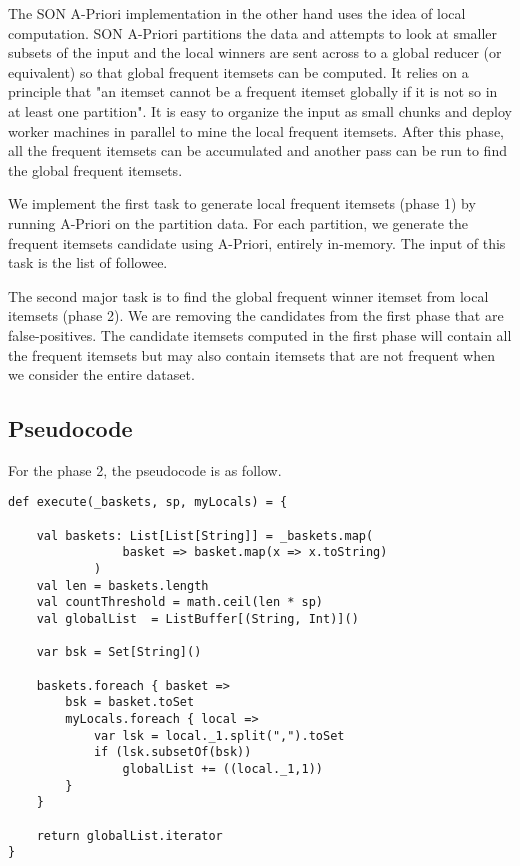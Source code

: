 \documentclass[11pt]{article}
\begin{document}
The SON A-Priori implementation in the other hand uses the idea of local computation.
SON A-Priori partitions the data and attempts to look at smaller subsets of the input and the local winners are sent across to a global reducer (or equivalent) so that global frequent itemsets can be computed.
It relies on a principle that "an itemset cannot be a frequent itemset globally if it is not so in at least one partition".
It is easy to organize the input as small chunks and deploy worker machines in parallel to mine the local frequent itemsets.
After this phase, all the frequent itemsets can be accumulated and another pass can be run to find the global frequent itemsets.

We implement the first task to generate local frequent itemsets (phase 1) by running A-Priori on the partition data.
For each partition, we generate the frequent itemsets candidate using A-Priori, entirely in-memory.
The input of this task is the list of followee.

The second major task is to find the global frequent winner itemset from local itemsets (phase 2).
We are removing the candidates from the first phase that are false-positives.
The candidate itemsets computed in the first phase will contain all the frequent itemsets but may also contain itemsets that are not frequent when we consider the entire dataset.

\subsection{Pseudocode}

For the phase 2, the pseudocode is as follow.

\begin{lstlisting}
def execute(_baskets, sp, myLocals) = {

    val baskets: List[List[String]] = _baskets.map(
                basket => basket.map(x => x.toString)
            )
    val len = baskets.length
    val countThreshold = math.ceil(len * sp)
    val globalList  = ListBuffer[(String, Int)]()

    var bsk = Set[String]()

    baskets.foreach { basket =>
        bsk = basket.toSet
        myLocals.foreach { local =>
            var lsk = local._1.split(",").toSet
            if (lsk.subsetOf(bsk))
                globalList += ((local._1,1))
        }
    }

    return globalList.iterator
}
\end{lstlisting}
\end{document}
